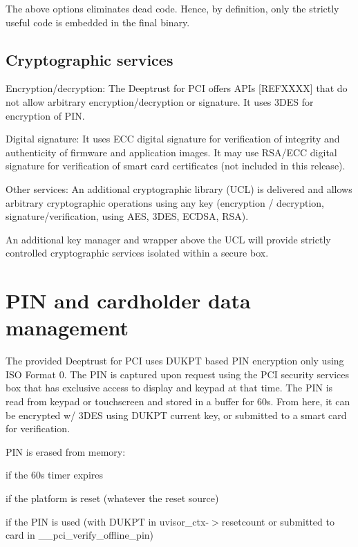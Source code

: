 The above options eliminates dead code. Hence, by definition, only the strictly useful code is embedded in the final binary.\hypertarget{_p_c_i_g_u_i_d_a_n_c_e_sub_crypto}{}\subsection{Cryptographic services}\label{_p_c_i_g_u_i_d_a_n_c_e_sub_crypto}
Encryption/decryption\+: The Deeptrust for P\+CI offers A\+P\+Is \mbox{[}R\+E\+F\+X\+X\+XX\mbox{]} that do not allow arbitrary encryption/decryption or signature. It uses 3\+D\+ES for encryption of P\+IN.

Digital signature\+: It uses E\+CC digital signature for verification of integrity and authenticity of firmware and application images. It may use R\+S\+A/\+E\+CC digital signature for verification of smart card certificates (not included in this release).

Other services\+: An additional cryptographic library (U\+CL) is delivered and allows arbitrary cryptographic operations using any key (encryption / decryption, signature/verification, using A\+ES, 3\+D\+ES, E\+C\+D\+SA, R\+SA).

An additional key manager and wrapper above the U\+CL will provide strictly controlled cryptographic services isolated within a secure box.\hypertarget{_p_c_i_g_u_i_d_a_n_c_e_sect_PIN}{}\section{P\+I\+N and cardholder data management}\label{_p_c_i_g_u_i_d_a_n_c_e_sect_PIN}
The provided Deeptrust for P\+CI uses D\+U\+K\+PT based P\+IN encryption only using I\+SO Format 0. The P\+IN is captured upon request using the P\+CI security services box that has exclusive access to display and keypad at that time. The P\+IN is read from keypad or touchscreen and stored in a buffer for 60s. From here, it can be encrypted w/ 3\+D\+ES using D\+U\+K\+PT current key, or submitted to a smart card for verification.

P\+IN is erased from memory\+:
\begin{DoxyItemize}
\item if the 60s timer expires
\item if the platform is reset (whatever the reset source)
\item if the P\+IN is used (with D\+U\+K\+PT in {\ttfamily uvisor\+\_\+ctx-\/$>$resetcount} or submitted to card in {\ttfamily \+\_\+\+\_\+pci\+\_\+verify\+\_\+offline\+\_\+pin})
\end{DoxyItemize}

